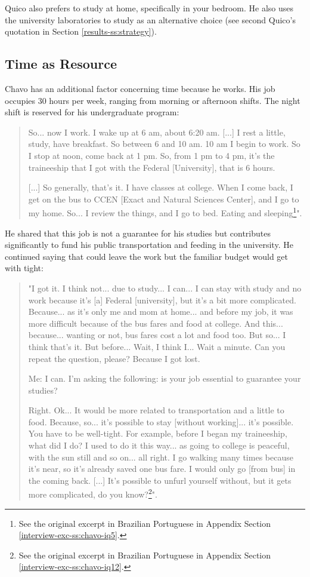 Quico also prefers to study at home, specifically in your bedroom. He also uses the university laboratories to study as an alternative choice (see second Quico's quotation in Section \ref{results-ss:strategy}).

\subsection{Time as Resource}
\label{results-ss:time}

Chavo has an additional factor concerning time because he works. His job occupies 30 hours per week, ranging from morning or afternoon shifts. The night shift is reserved for his undergraduate program:
\begin{quote}
    So... now I work. I wake up at 6 am, about 6:20 am. [...] I rest a little, study, have breakfast. So between 6 and 10 am. 10 am I begin to work. So I stop at noon, come back at 1 pm. So, from 1 pm to 4 pm, it's the traineeship that I got with the Federal [University], that is 6 hours.

    [...] So generally, that's it. I have classes at college. When I come back, I get on the bus to CCEN [Exact and Natural Sciences Center], and I go to my home. So... I review the things, and I go to bed. Eating and sleeping\footnote{See the original excerpt in Brazilian Portuguese in Appendix Section \ref{interview-exc-ss:chavo-iq5}.}".    
\end{quote}
He shared that this job is not a guarantee for his studies but contributes significantly to fund his public transportation and feeding in the university. He continued saying that could leave the work but the familiar budget would get with tight:
\begin{quote}
    "I got it. I think not... due to study... I can... I can stay with study and no work because it's [a] Federal [university], but it's a bit more complicated. Because... as it's only me and mom at home... and before my job, it was more difficult because of the bus fares and food at college. And this... because... wanting or not, bus fares cost a lot and food too. But so... I think that's it. But before... Wait, I think I... Wait a minute. Can you repeat the question, please? Because I got lost.

    \colorbox{black!15}{Me: I can. I'm asking the following: is your job essential to guarantee your studies?}

    Right. Ok... It would be more related to transportation and a little to food. Because, so... it's possible to stay [without working]... it's possible. You have to be well-tight. For example, before I began my traineeship, what did I do? I used to do it this way... as going to college is peaceful, with the sun still and so on... all right. I go walking many times because it's near, so it's already saved one bus fare. I would only go [from bus] in the coming back. [...] It's possible to unfurl yourself without, but it gets more complicated, do you know?\footnote{See the original excerpt in Brazilian Portuguese in Appendix Section \ref{interview-exc-ss:chavo-iq12}.}".
\end{quote}


